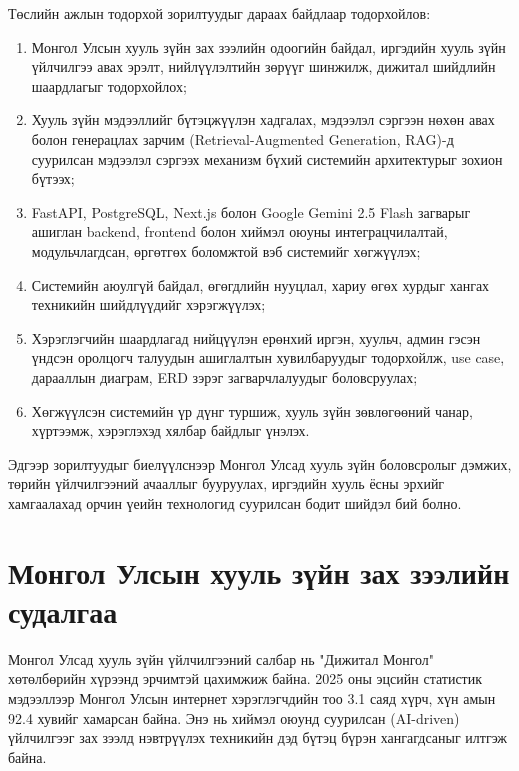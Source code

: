 Төслийн ажлын тодорхой зорилтуудыг дараах байдлаар тодорхойлов:

\begin{enumerate}
    \item Монгол Улсын хууль зүйн зах зээлийн одоогийн байдал, иргэдийн хууль зүйн үйлчилгээ авах эрэлт, нийлүүлэлтийн зөрүүг шинжилж, дижитал шийдлийн шаардлагыг тодорхойлох;

    \item Хууль зүйн мэдээллийг бүтэцжүүлэн хадгалах, мэдээлэл сэргээн нөхөн авах болон генерацлах зарчим (Retrieval-Augmented Generation, RAG)-д суурилсан мэдээлэл сэргээх механизм бүхий системийн архитектурыг зохион бүтээх;

    \item FastAPI, PostgreSQL, Next.js болон Google Gemini 2.5 Flash загварыг ашиглан backend, frontend болон хиймэл оюуны интеграцчилалтай, модульчлагдсан, өргөтгөх боломжтой вэб системийг хөгжүүлэх;

    \item Системийн аюулгүй байдал, өгөгдлийн нууцлал, хариу өгөх хурдыг хангах техникийн шийдлүүдийг хэрэгжүүлэх;

    \item Хэрэглэгчийн шаардлагад нийцүүлэн ерөнхий иргэн, хуульч, админ гэсэн үндсэн оролцогч талуудын ашиглалтын хувилбаруудыг тодорхойлж, use case, дарааллын диаграм, ERD зэрэг загварчлалуудыг боловсруулах;

    \item Хөгжүүлсэн системийн үр дүнг туршиж, хууль зүйн зөвлөгөөний чанар, хүртээмж, хэрэглэхэд хялбар байдлыг үнэлэх.
\end{enumerate}

Эдгээр зорилтуудыг биелүүлснээр Монгол Улсад хууль зүйн боловсролыг дэмжих, төрийн үйлчилгээний ачааллыг бууруулах, иргэдийн хууль ёсны эрхийг хамгаалахад орчин үеийн технологид суурилсан бодит шийдэл бий болно.


\section{Монгол Улсын хууль зүйн зах зээлийн судалгаа}

Монгол Улсад хууль зүйн үйлчилгээний салбар нь "Дижитал Монгол" хөтөлбөрийн хүрээнд эрчимтэй цахимжиж байна. 2025 оны эцсийн статистик мэдээллээр Монгол Улсын интернет хэрэглэгчдийн тоо 3.1 саяд хүрч, хүн амын 92.4 хувийг хамарсан байна. Энэ нь хиймэл оюунд суурилсан (AI-driven) үйлчилгээг зах зээлд нэвтрүүлэх техникийн дэд бүтэц бүрэн хангагдсаныг илтгэж байна.

